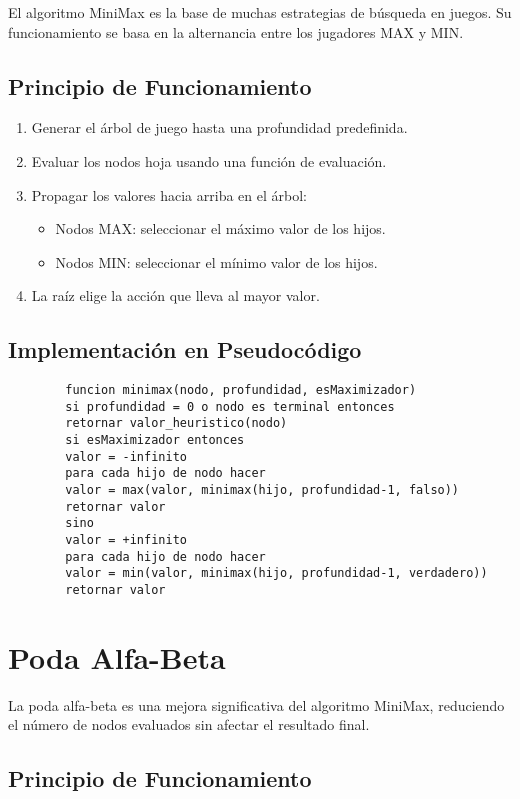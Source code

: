 \documentclass[12pt,a4paper]{report}
\begin{document}
	El algoritmo MiniMax es la base de muchas estrategias de búsqueda en juegos. Su funcionamiento se basa en la alternancia entre los jugadores MAX y MIN.
	
	\subsection{Principio de Funcionamiento}
	
	\begin{enumerate}
		\item Generar el árbol de juego hasta una profundidad predefinida.
		\item Evaluar los nodos hoja usando una función de evaluación.
		\item Propagar los valores hacia arriba en el árbol:
		\begin{itemize}
			\item Nodos MAX: seleccionar el máximo valor de los hijos.
			\item Nodos MIN: seleccionar el mínimo valor de los hijos.
		\end{itemize}
		\item La raíz elige la acción que lleva al mayor valor.
	\end{enumerate}
	
	\subsection{Implementación en Pseudocódigo}
	
	\begin{verbatim}
		funcion minimax(nodo, profundidad, esMaximizador)
		si profundidad = 0 o nodo es terminal entonces
		retornar valor_heuristico(nodo)
		si esMaximizador entonces
		valor = -infinito
		para cada hijo de nodo hacer
		valor = max(valor, minimax(hijo, profundidad-1, falso))
		retornar valor
		sino
		valor = +infinito
		para cada hijo de nodo hacer
		valor = min(valor, minimax(hijo, profundidad-1, verdadero))
		retornar valor
	\end{verbatim}
	
	\section{Poda Alfa-Beta}
	
	La poda alfa-beta es una mejora significativa del algoritmo MiniMax, reduciendo el número de nodos evaluados sin afectar el resultado final.
	
	\subsection{Principio de Funcionamiento}
	
\end{document}
